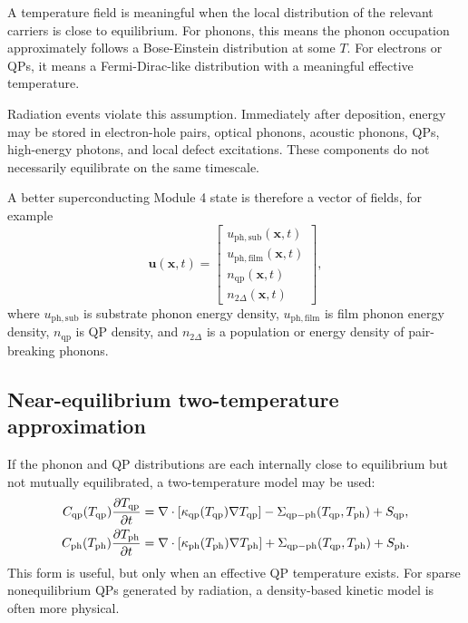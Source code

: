 \documentclass[11pt]{article}
\newcommand{\Tph}{T_{\mathrm{ph}}}
\newcommand{\Tqp}{T_{\mathrm{qp}}}
\newcommand{\kappaph}{\kappa_{\mathrm{ph}}}
\newcommand{\kappaqp}{\kappa_{\mathrm{qp}}}
\newcommand{\Cph}{C_{\mathrm{ph}}}
\newcommand{\Cqp}{C_{\mathrm{qp}}}
\newcommand{\x}{\mathbf{x}}
\begin{document}
A temperature field is meaningful when the local distribution of the relevant carriers is close to equilibrium. For phonons, this means the phonon occupation approximately follows a Bose-Einstein distribution at some \(T\). For electrons or QPs, it means a Fermi-Dirac-like distribution with a meaningful effective temperature.

Radiation events violate this assumption. Immediately after deposition, energy may be stored in electron-hole pairs, optical phonons, acoustic phonons, QPs, high-energy photons, and local defect excitations. These components do not necessarily equilibrate on the same timescale.

A better superconducting Module 4 state is therefore a vector of fields, for example
\begin{equation}
\mathbf{u}(\x,t)=
\begin{bmatrix}
u_{\mathrm{ph,sub}}(\x,t) \\
u_{\mathrm{ph,film}}(\x,t) \\
 n_{\mathrm{qp}}(\x,t) \\
 n_{2\Delta}(\x,t)
\end{bmatrix},
\label{eq:state_vector}
\end{equation}
where \(u_{\mathrm{ph,sub}}\) is substrate phonon energy density, \(u_{\mathrm{ph,film}}\) is film phonon energy density, \(n_{\mathrm{qp}}\) is QP density, and \(n_{2\Delta}\) is a population or energy density of pair-breaking phonons.

\subsection{Near-equilibrium two-temperature approximation}

If the phonon and QP distributions are each internally close to equilibrium but not mutually equilibrated, a two-temperature model may be used:
\begin{align}
\Cqp(\Tqp)\pdv{\Tqp}{t}
&=\nabla\cdot\left[\kappaqp(\Tqp)\nabla\Tqp\right]
-\Sigma_{\mathrm{qp-ph}}(\Tqp,\Tph)+S_{\mathrm{qp}},
\label{eq:twoT_qp}\\
\Cph(\Tph)\pdv{\Tph}{t}
&=\nabla\cdot\left[\kappaph(\Tph)\nabla\Tph\right]
+\Sigma_{\mathrm{qp-ph}}(\Tqp,\Tph)+S_{\mathrm{ph}}.
\label{eq:twoT_ph}
\end{align}
This form is useful, but only when an effective QP temperature exists. For sparse nonequilibrium QPs generated by radiation, a density-based kinetic model is often more physical.
\end{document}
